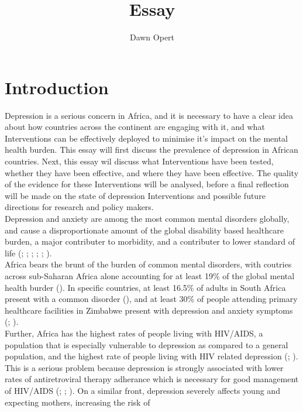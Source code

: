 \documentclass[stu,a4paper,12pt,donotrepeattitle]{apa7}
\title{Essay}
\author{Dawn Opert}
\affiliation{OPRNET001}
\begin{document}
\maketitle
\section{Introduction}
Depression is a serious concern in Africa, and it is necessary to have a clear
idea about how countries across the continent are engaging with it, and what
Interventions can be effectively deployed to minimise it's impact on the mental
health burden. This essay will first discuss the prevalence of depression in
African countries. Next, this essay wil discuss what Interventions have been
tested, whether they have been effective, and where they have been effective.
The quality of the evidence for these Interventions will be analysed, before
a final reflection will be made on the state of depression Interventions and
possible future directions for research and policy makers.\\
Depression and anxiety are among the most common mental disorders globally, and
cause a disproportionate amount of the global disability based healthcare
burden, a major contributer to morbidity, and a contributer to lower standard
of life (\cite{chibandaetal15}; \cite{chibandaetal16}; \cite{douketal21};
\cite{fernaetal21}; \cite{logetal18}; \cite{lunetal14}).\\
Africa bears the brunt of the burden of common mental disorders, with
coutries across sub-Saharan Africa alone accounting for at least 19\% of the
global mental health burder (\cite{lunderal15}). In specific countries, at
least 16.5\% of adults in South Africa present with a common disorder
(\cite{lunetal14}), and at least 30\% of people attending primary healthcare
facilities in Zimbabwe present with depression and anxiety symptoms
(\cite{chibandaetal11}; \cite{chibandaetal15}).\\
Further, Africa has the highest rates of people living with HIV/AIDS, a
population that is especially vulnerable to depression as compared to a general
population, and the highest rate of people living with HIV related depression
(\cite{logetal18}; \cite{petersenetal14}). This is a serious problem because
depression is strongly associated with lower rates of antiretroviral therapy
adherance which is necessary for good management of HIV/AIDS (\cite{logetal18};
\cite{lunetal14}; \cite{petersenetal14}). On a similar front, depression
severely affects young and expecting mothers, increasing the risk of
\end{document}
